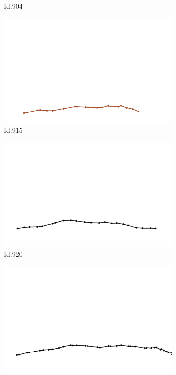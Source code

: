 \documentclass[12pt,twoside]{report}
\begin{document}
\begin{figure}
\begin{subfigure}[b]{0.20\textwidth}
\caption{Id:904}
\end{subfigure}
\begin{subfigure}[b]{0.20\textwidth}
\centering
\includegraphics[width=\textwidth]{../trajectories/915.png}
\caption{Id:915}
\end{subfigure}
\begin{subfigure}[b]{0.20\textwidth}
\centering
\includegraphics[width=\textwidth]{../trajectories/920.png}
\caption{Id:920}
\end{subfigure}
\begin{subfigure}[b]{0.20\textwidth}
\centering
\includegraphics[width=\textwidth]{../trajectories/927.png}

\end{subfigure}
\end{figure}
\end{document}

